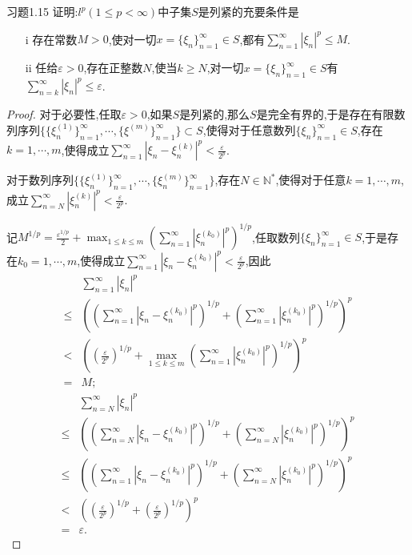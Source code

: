 \documentclass[lang = cn, scheme = chinese]{elegantbook}
\begin{document}
	\begin{proposition}{习题1.15}
		证明:$l^p(1\le p <\infty)$中子集$S$是列紧的充要条件是
		\begin{enumerate}
			\item [i] 存在常数$M>0$,使对一切$x=\{ \xi_{n} \}_{n=1}^{\infty}\in S$,都有$\displaystyle \sum_{n=1}^{\infty}|\xi_n|^p \le M$.
			\item [ii]任给$\varepsilon>0$,存在正整数$N$,使当$k\ge N$,对一切$x=\{ \xi_{n} \}_{n=1}^{\infty}\in S$有$\displaystyle \sum_{n=k}^{\infty}|\xi_n|^p \le \varepsilon$.
		\end{enumerate}
	\end{proposition}
	
	\begin{proof}
		对于必要性,任取$\varepsilon>0$,如果$S$是列紧的,那么$S$是完全有界的,于是存在有限数列序列$\{ \{\xi_n^{(1)}\}_{n=1}^{\infty},\cdots,\{\xi^{(m)}\}_{n=1}^{\infty} \}\subset S$,使得对于任意数列$\{\xi_n\}_{n=1}^{\infty}\in S$,存在$k=1,\cdots,m$,使得成立$\displaystyle\sum_{n=1}^{\infty}|\xi_n-\xi_n^{(k)}|^p<\frac{\varepsilon}{2^p}$.
		
		对于数列序列$\{ \{\xi_n^{(1)}\}_{n=1}^{\infty},\cdots,\{\xi_n^{(m)}\}_{n=1}^{\infty} \}$,存在$N\in\mathbb{N}^*$,使得对于任意$k=1,\cdots,m$,成立$\displaystyle\sum_{n=N}^{\infty}|\xi_n^{(k)}|^p<\frac{\varepsilon}{2^p}$.
		
		记$\displaystyle M^{1/p}=\frac{\varepsilon^{1/p}}{2}+\max_{1\le k\le m}\left(\sum_{n=1}^{\infty}|\xi_n^{(k_0)}|^p\right)^{1/p}$,任取数列$\{\xi_n\}_{n=1}^{\infty}\in S$,于是存在$k_0=1,\cdots,m$,使得成立$\displaystyle\sum_{n=1}^{\infty}|\xi_n-\xi_n^{(k_0)}|^p<\frac{\varepsilon}{2^p}$,因此
		\begin{align*}
			&\sum_{n=1}^{\infty}|\xi_n|^p\\
			\le &\left(\left(\sum_{n=1}^{\infty}|\xi_n-\xi_n^{(k_0)}|^p\right)^{1/p}+\left(\sum_{n=1}^{\infty}|\xi_n^{(k_0)}|^p\right)^{1/p}\right)^p\\
			<&\left(\left(\frac{\varepsilon}{2^p}\right)^{1/p}+\max_{1\le k\le m}\left(\sum_{n=1}^{\infty}|\xi_n^{(k_0)}|^p\right)^{1/p}\right)^p\\
			=&M;
		\end{align*}
		\begin{align*}
			&\sum_{n=N}^{\infty}|\xi_n|^p\\
			\le &\left(\left(\sum_{n=N}^{\infty}|\xi_n-\xi_n^{(k_0)}|^p\right)^{1/p}+\left(\sum_{n=N}^{\infty}|\xi_n^{(k_0)}|^p\right)^{1/p}\right)^p\\
			\le &\left(\left(\sum_{n=1}^{\infty}|\xi_n-\xi_n^{(k_0)}|^p\right)^{1/p}+\left(\sum_{n=N}^{\infty}|\xi_n^{(k_0)}|^p\right)^{1/p}\right)^p\\
			<&\left(\left(\frac{\varepsilon}{2^p}\right)^{1/p}+\left(\frac{\varepsilon}{2^p}\right)^{1/p}\right)^p\\
			=&\varepsilon.
		\end{align*}
		

\end{proof}
\end{document}

